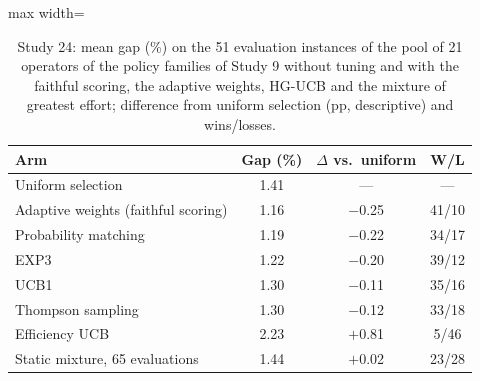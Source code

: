 \begin{table}[t]
\caption{Study 24: mean gap (\%) on the 51 evaluation instances of the pool of 21 operators of the policy families of Study 9 without tuning and with the faithful scoring, the adaptive weights, HG-UCB and the mixture of greatest effort; difference from uniform selection (pp, descriptive) and wins/losses.}\label{tab:s24a}
\centering
\small
\begin{adjustbox}{max width=\linewidth}
\begin{tabular}{lccc}
\toprule
Arm & Gap (\%) & $\Delta$ vs.\ uniform & W/L \\
\midrule
Uniform selection & 1.41 & --- & --- \\
Adaptive weights (faithful scoring) & 1.16 & $-$0.25 & 41/10 \\
Probability matching & 1.19 & $-$0.22 & 34/17 \\
EXP3 & 1.22 & $-$0.20 & 39/12 \\
UCB1 & 1.30 & $-$0.11 & 35/16 \\
Thompson sampling & 1.30 & $-$0.12 & 33/18 \\
Efficiency UCB & 2.23 & $+$0.81 & 5/46 \\
Static mixture, 65 evaluations & 1.44 & $+$0.02 & 23/28 \\
\bottomrule
\end{tabular}
\end{adjustbox}
\end{table}
